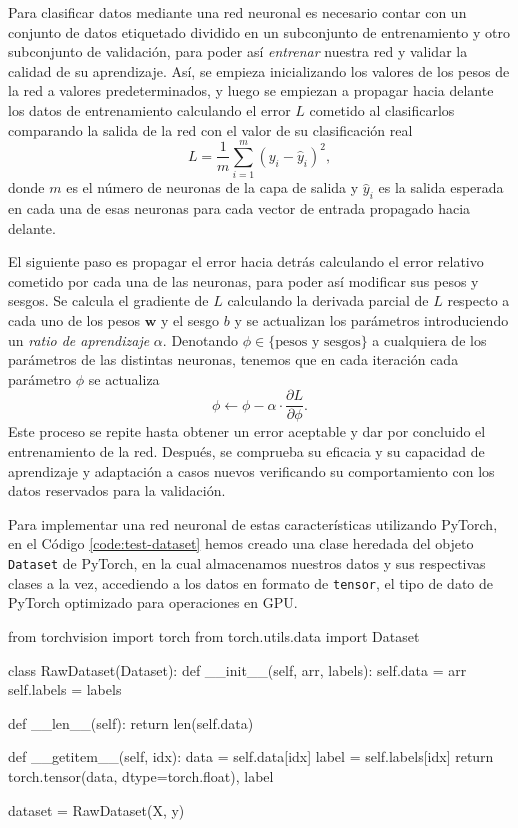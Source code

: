 Para clasificar datos mediante una red neuronal es necesario contar con un conjunto de datos etiquetado dividido en un subconjunto de entrenamiento y otro subconjunto de validación, para poder así \textit{entrenar} nuestra red y validar la calidad de su aprendizaje. Así, se empieza inicializando los valores de los pesos de la red a valores predeterminados, y luego se empiezan a propagar hacia delante los datos de entrenamiento calculando el error $ L $ cometido al clasificarlos comparando la salida de la red con el valor de su clasificación real
\begin{equation}
  L = \frac{1}{m} \sum_{i=1}^{m}(y_i - \hat{y}_i)^2,
\end{equation}
donde $ m $ es el número de neuronas de la capa de salida y $ \hat{y}_i $ es la salida esperada en cada una de esas neuronas para cada vector de entrada propagado hacia delante.

El siguiente paso es propagar el error hacia detrás calculando el error relativo cometido por cada una de las neuronas, para poder así modificar sus pesos y sesgos. Se calcula el gradiente de $ L $ calculando la derivada parcial de $ L $ respecto a cada uno de los pesos $ \mathbf{w} $ y el sesgo $ b $ y se actualizan los parámetros introduciendo un \textit{ratio de aprendizaje} $ \alpha $. Denotando $ \phi \in \{\text{pesos y sesgos}\} $ a cualquiera de los parámetros de las distintas neuronas, tenemos que en cada iteración cada parámetro $ \phi $ se actualiza
\begin{equation}
  \phi \leftarrow \phi - \alpha \cdot \frac{\partial L}{\partial \phi}.
\end{equation}
Este proceso se repite hasta obtener un error aceptable y dar por concluido el entrenamiento de la red. Después, se comprueba su eficacia y su capacidad de aprendizaje y adaptación a casos nuevos verificando su comportamiento con los datos reservados para la validación.

Para implementar una red neuronal de estas características utilizando PyTorch, en el Código \ref{code:test-dataset} hemos creado una clase heredada del objeto \texttt{Dataset} de PyTorch, en la cual almacenamos nuestros datos y sus respectivas clases a la vez, accediendo a los datos en formato de \texttt{tensor}, el tipo de dato de PyTorch optimizado para operaciones en GPU.

\begin{mypython}[float={h}, caption={\texttt{Dataset} de los datos artificiales.}, label={code:test-dataset}]
  from torchvision import torch
  from torch.utils.data import Dataset

  class RawDataset(Dataset):
  def __init__(self, arr, labels):
  self.data = arr
  self.labels = labels

  def __len__(self):
  return len(self.data)

  def __getitem__(self, idx):
  data = self.data[idx]
  label = self.labels[idx]
  return torch.tensor(data, dtype=torch.float), label

  dataset = RawDataset(X, y)
\end{mypython}

